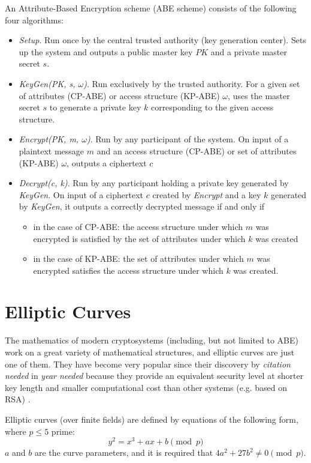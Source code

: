 An Attribute-Based Encryption scheme (ABE scheme) consists of the following four algorithms: 
\begin{itemize}
    \item \emph{Setup}. Run once by the central trusted authority (key generation center). Sets up the system and outputs a public master key $PK$ and a private master secret $s$.
    \item \emph{KeyGen(PK, s, $\omega$)}. Run exclusively by the trusted authority. For a given set of attributes (CP-ABE) or access structure (KP-ABE) $\omega$, uses the master secret $s$ to generate a private key $k$ corresponding to the given access structure.
    \item \emph{Encrypt(PK, m, $\omega$)}. Run by any participant of the system. On input of a plaintext message $m$ and an access structure (CP-ABE) or set of attributes (KP-ABE) $\omega$, outputs a ciphertext $c$
    \item \emph{Decrypt(c, k)}. Run by any participant holding a private key generated by \emph{KeyGen}. On input of a ciphertext $c$ created by \emph{Encrypt} and a key $k$ generated by \emph{KeyGen}, it outputs a correctly decrypted message if and only if
    \begin{itemize}
        \item in the case of CP-ABE: the access structure under which $m$ was encrypted is satisfied by the set of attributes under which $k$ was created
        \item in the case of KP-ABE: the set of attributes under which $m$ was encrypted satisfies the access structure under which $k$ was created.
    \end{itemize}
\end{itemize}


\section{Elliptic Curves}

The mathematics of modern cryptosystems (including, but not limited to ABE) work on a great variety of mathematical structures, and elliptic curves are just one of them.
They have become very popular since their discovery by \emph{citation needed} in \emph{year needed} because they provide an equivalent security level at shorter key length and smaller computational cost than other systems (e.g. based on RSA) \cite{katz_introduction_2015}.

Elliptic curves (over finite fields) are defined by equations of the following form, where $p \leq 5$ prime: \cite{katz_introduction_2015}
\begin{equation}
    y^2 = x^3 + a x + b \pmod{p}
\end{equation}
$a$ and $b$ are the curve parameters, and it is required that $4a^2 + 27b^2 \neq 0 \pmod{p}$.\cite{katz_introduction_2015}

